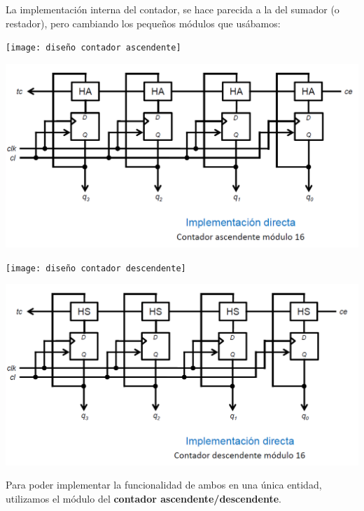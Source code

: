 \documentclass[a4paper,10pt]{book}
\begin{document}
La implementación interna del contador, se hace parecida a la del sumador (o restador), pero cambiando los pequeños módulos que usábamos:

\begin{center}
\texttt{[image: diseño contador ascendente]}
\end{center}

\begin{center}
\includegraphics[scale=0.39]{implementacion contador ascendente}
\end{center}

\begin{center}
\texttt{[image: diseño contador descendente]}
\end{center}

\begin{center}
\includegraphics[scale=0.39]{implementacion contador descendente}
\end{center}

Para poder implementar la funcionalidad de ambos en una única entidad, utilizamos el módulo del \textbf{contador ascendente/descendente}.
\end{document}
